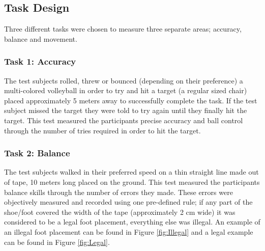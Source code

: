 \documentclass[runningheads,a4paper,oribibl]{llncs}
\begin{document}
\subsection{Task Design} \label{subsec:TaskDesign}
Three different tasks were chosen to measure three separate areas; accuracy, balance and movement.

\subsubsection{Task 1: Accuracy}

The test subjects rolled, threw or bounced (depending on their preference) a multi-colored volleyball in order to try and hit a target (a regular sized chair) placed approximately 5 meters away to successfully complete the task. If the test subject missed the target they were told to try again until they finally hit the target. This test measured the participants precise accuracy and ball control through the number of tries required in order to hit the target.


\subsubsection{Task 2: Balance}

The test subjects walked in their preferred speed on a thin straight line made out of tape, 10 meters long placed on the ground. This test measured the participants balance skills through the number of errors they made. These errors were objectively measured and recorded using one pre-defined rule; if any part of the shoe/foot covered the width of the tape (approximately 2 cm wide) it was considered to be a legal foot placement, everything else was illegal. An example of an illegal foot placement can be found in Figure \ref{fig:Illegal} and a legal example can be found in Figure \ref{fig:Legal}.
\end{document}

